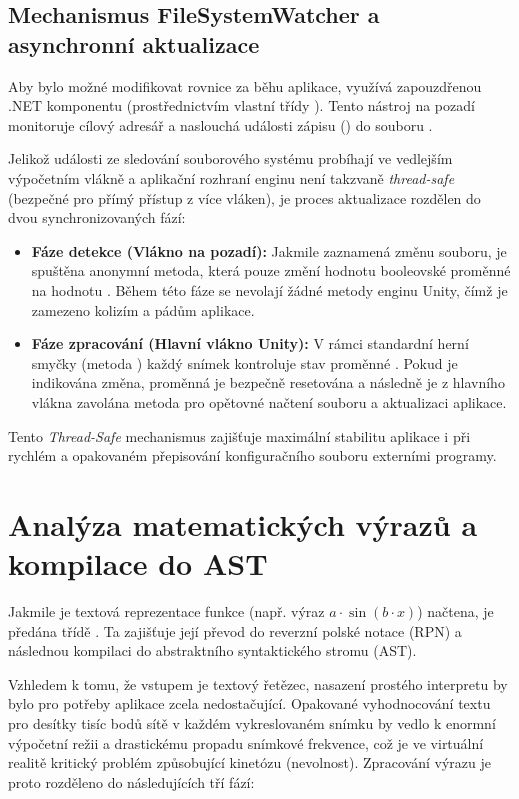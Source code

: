 \documentclass[czech, kiv, sem, he, iso690alph, pdf,viewonly]{fasthesis}
\begin{document}
\subsection{Mechanismus FileSystemWatcher a asynchronní aktualizace}
Aby bylo možné modifikovat rovnice za běhu aplikace, využívá  zapouzdřenou .NET komponentu  (prostřednictvím vlastní třídy ). 
Tento nástroj na pozadí monitoruje cílový adresář a naslouchá události zápisu () do souboru .

Jelikož události ze sledování souborového systému probíhají ve vedlejším výpočetním vlákně a aplikační rozhraní enginu  není takzvaně \textit{thread-safe} (bezpečné pro přímý přístup z více vláken), 
je proces aktualizace rozdělen do dvou synchronizovaných fází:

\begin{itemize}
    \item \textbf{Fáze detekce (Vlákno na pozadí):} Jakmile  zaznamená změnu souboru, je spuštěna anonymní metoda, která pouze změní hodnotu booleovské proměnné  na hodnotu . Během této fáze se nevolají žádné metody enginu Unity, čímž je zamezeno kolizím a pádům aplikace.
    \item \textbf{Fáze zpracování (Hlavní vlákno Unity):} V rámci standardní herní smyčky (metoda )  každý snímek kontroluje stav proměnné . Pokud je indikována změna, proměnná je bezpečně resetována a následně je z hlavního vlákna zavolána metoda pro opětovné načtení souboru a aktualizaci aplikace.
\end{itemize}

Tento \textit{Thread-Safe} mechanismus zajišťuje maximální stabilitu aplikace i při rychlém a opakovaném přepisování konfiguračního souboru externími programy.

\section{Analýza matematických výrazů a kompilace do AST}
Jakmile je textová reprezentace funkce (např. výraz $a \cdot \sin(b \cdot x)$) načtena, je předána třídě . 
Ta zajišťuje její převod do reverzní polské notace (RPN) a následnou kompilaci do abstraktního syntaktického stromu (AST). 

Vzhledem k tomu, že vstupem je textový řetězec, nasazení prostého interpretu by bylo pro potřeby aplikace zcela nedostačující. 
Opakované vyhodnocování textu pro desítky tisíc bodů sítě v každém vykreslovaném snímku by vedlo k enormní výpočetní režii a drastickému propadu snímkové frekvence, 
což je ve virtuální realitě kritický problém způsobující kinetózu (nevolnost). Zpracování výrazu je proto rozděleno do následujících tří fází:
\end{document}
